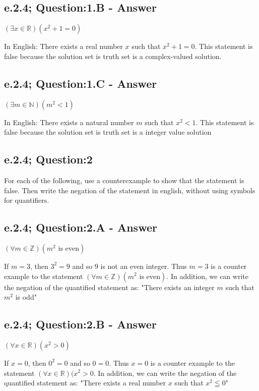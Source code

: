 \subsection{e.2.4; Question:1.B - Answer}
	\begin{center}
		$(\exists x \in \mathbb{R})(x^2 +1 = 0)$
	\end{center}
In English: There exists a real number $x$ such that $x^2 + 1 = 0$. This statement is false because the solution set is truth set is a complex-valued solution. 

\subsection{e.2.4; Question:1.C - Answer}
	\begin{center}
		$(\exists m \in \mathbb{N})(m^2<1)$
	\end{center}
In English: There exists a natural number $m$ such that $x^2 < 1$. This statement is false because the solution set is truth set is a integer value solution

\subsection{e.2.4; Question:2}
For each of the  following, use a counterexample to show that the statement is false. Then write the negation of the statement in english, without using symbols for quantifiers. 


\subsection{e.2.4; Question:2.A - Answer}
	\begin{center}
		$(\forall m \in \mathbb{Z})(m^2 \text{ is even})$
	\end{center}
If $m=3$, then $3^2 = 9$ and so $9$ is not an even integer. Thus  $m = 3$ is a counter example to the statement $(\forall m \in \mathbb{Z})(m^2 \text{ is even})$. In addition, we can write the negation of the quantified statement as: "There exists an integer $m$ such that $m^2$ is odd"

\subsection{e.2.4; Question:2.B - Answer}
	\begin{center}
		$(\forall x \in \mathbb{R})(x^2 > 0)$
	\end{center}
If $x = 0$, then $0^2 = 0$ and so $0 = 0$. Thus  $x = 0$ is a counter example to the statement $(\forall x \in \mathbb{R})(x^2 > 0$. In addition, we can write the negation of the quantified statement as: "There exists a real number $x$ such that $x^2 \leqq 0$"

